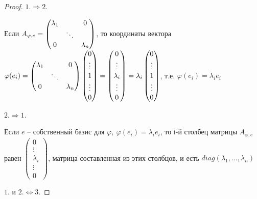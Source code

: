 \documentclass[a4paper, 12pt]{article}
\theoremstyle{definition}
\begin{document}
    \begin{proof}
        $1. \Longrightarrow 2.$
        
        Если $A_{\varphi,e} = 
        \begin{pmatrix}
            \lambda_1 & \null & 0\\ \null & \ddots & \null\\
            0 & \null & \lambda_n
        \end{pmatrix}
        $, то координаты вектора\\ $\varphi(e_i) = 
        \begin{pmatrix}
            \lambda_1 & \null & 0\\ \null & \ddots & \null\\
            0 & \null & \lambda_n
        \end{pmatrix}
        \begin{pmatrix}0\\\vdots\\1\\\vdots\\0\end{pmatrix} = 
        \begin{pmatrix}0\\\vdots\\ \lambda_i\\\vdots\\0
        \end{pmatrix} = \lambda_i \begin{pmatrix}
        0\\\vdots\\1\\\vdots\\0\end{pmatrix}$, т.е.
        $\varphi(e_i) = \lambda_ie_i$
        
        $2. \Longrightarrow 1.$ 

        Если $e$ -- собственный базис для $\varphi,\ 
        \varphi(e_i) = \lambda_ie_i$, то i-й столбец матрицы
        $A_{\varphi,e}$ равен $\begin{pmatrix}0\\\vdots\\
        \lambda_i\\\vdots\\0\end{pmatrix}$, матрица составленная
        из этих столбцов, и есть $diag(\lambda_1,...,\lambda_n)$ 
    
        $1. \text{ и } 2. \Longleftrightarrow 3.$


\end{proof}
\end{document}
